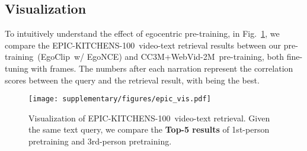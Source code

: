 \documentclass{article}
\newcommand{\dataset}{EgoClip}
\newcommand{\model}{EgoNCE\xspace}
\newcommand{\epic}{EPIC-KITCHENS-100}
\newcommand{\ccweb}{CC3M+WebVid-2M}
\begin{document}
\subsection{Visualization}
To intuitively understand the effect of egocentric pre-training, in Fig.~\ref{fig_epic_vis}, we compare the \epic~video-text retrieval results between our pre-training~(\dataset~w/ \model) and \ccweb~pre-training, both fine-tuning with  frames. 
The numbers after each narration represent the correlation scores between the query and the retrieval result, with  being the best.
\begin{figure}[htb]
\centering
\vspace{-0.3cm}
\centering
\texttt{[image: supplementary/figures/epic\_vis.pdf]}
\label{case_1}
\centering
\vspace{-0.4em}
\caption{Visualization of \epic~video-text retrieval. 
Given the same text query, we compare the \textbf{Top-5 results} of 1st-person pretraining and 3rd-person pretraining.}
\label{fig_epic_vis}
\end{figure}  
\end{document}
